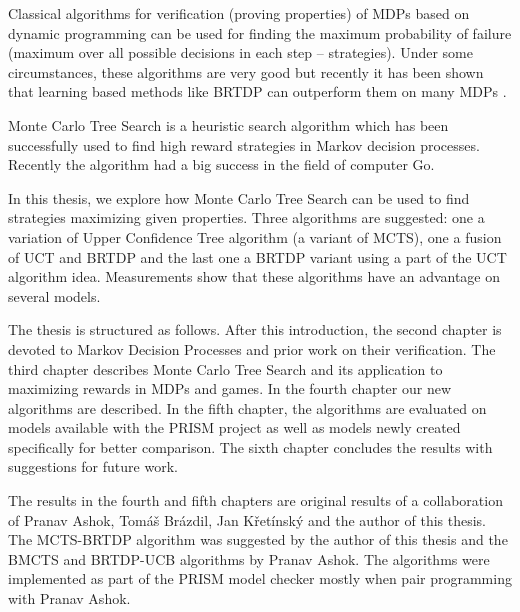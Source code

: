 Classical algorithms for verification (proving properties) of MDPs
based on dynamic programming can be used for finding the
maximum probability of failure (maximum over all possible decisions in
each step -- strategies). Under some circumstances, these algorithms are
very good but recently it has been shown that learning based methods
like BRTDP can outperform them on many MDPs \parencite{atva14}.

Monte Carlo Tree Search is a heuristic search algorithm which has been
successfully used to find high reward strategies in Markov decision
processes. Recently the algorithm had a big success in the field of
computer Go.

In this thesis, we explore how Monte Carlo Tree Search can be used to
find strategies maximizing given properties. Three algorithms are
suggested: one a variation of Upper Confidence Tree algorithm (a variant
of MCTS), one a fusion of UCT and BRTDP and the last one a BRTDP variant
using a part of the UCT algorithm idea.  Measurements show that these
algorithms have an advantage on several models.

The thesis is structured as follows. After this introduction, the second
chapter is devoted to Markov Decision Processes and prior work on their
verification.
The third chapter describes Monte Carlo Tree Search and its application
to maximizing rewards in MDPs and games. In the fourth chapter our new
algorithms are described. In the fifth chapter,
the algorithms are evaluated on models available with the PRISM project
as well as models newly created specifically for better comparison.
The sixth chapter concludes the
results with suggestions for future work.

The results in the fourth and fifth chapters are original results of
a collaboration of Pranav Ashok, Tomáš Brázdil, Jan Křetínský and the
author of this thesis. The MCTS-BRTDP algorithm was suggested by the
author of this thesis and the BMCTS and BRTDP-UCB algorithms by Pranav
Ashok. The algorithms were implemented as part of the PRISM model
checker mostly when pair programming with Pranav Ashok.
